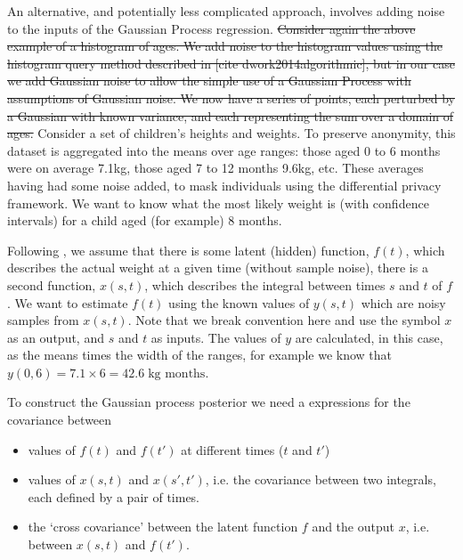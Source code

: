 \documentclass[a4paper]{article}
\begin{document}
\begin{multicols}{2}
An alternative, and potentially less complicated approach, involves adding noise to the inputs of the Gaussian Process regression. \sout{Consider again the above example of a histogram of ages. We add noise to the histogram values using the histogram query method described in [cite dwork2014algorithmic], but in our case we add Gaussian noise to allow the simple use of a Gaussian Process with assumptions of Gaussian noise. We now have a series of points, each perturbed by a Gaussian with known variance, and each representing the sum over a domain of ages.}
Consider a set of children's heights and weights. To preserve anonymity, this dataset is aggregated into the means over age ranges: those aged 0 to 6 months were on average 7.1kg, those aged 7 to 12 months 9.6kg, etc. These averages having had some noise added, to mask individuals using the differential privacy framework. We want to know what the most likely weight is (with confidence intervals) for a child aged (for example) 8 months.

Following \citet{lawrence2006modelling}, we assume that there is some latent (hidden) function, $f(t)$, which describes the actual weight at a given time (without sample noise), there is a second function, $x(s,t)$, which describes the integral between times $s$ and $t$ of $f$. We want to estimate $f(t)$ using the known values of $y(s,t)$ which are noisy samples from $x(s,t)$. Note that we break convention here and use the symbol $x$ as an output, and $s$ and $t$ as inputs. The values of $y$ are calculated, in this case, as the means times the width of the ranges, for example we know that\\ $y(0,6) = 7.1 \times 6 = 42.6\; \textrm{kg months}$.

To construct the Gaussian process posterior we need a expressions for the covariance between
\begin{itemize}
\item values of $f(t)$ and $f(t')$ at different times ($t$ and $t'$)
\item values of $x(s,t)$ and $x(s',t')$, i.e. the covariance between two integrals, each defined by a pair of times.
\item the `cross covariance' between the latent function $f$ and the output $x$, i.e. between $x(s,t)$ and $f(t')$.
\end{itemize}


\end{multicols}
\end{document}
